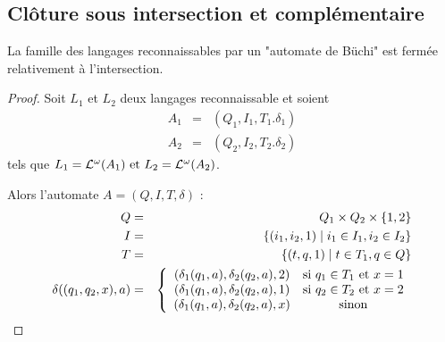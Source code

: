 \subsection{Clôture sous intersection et complémentaire}

\begin{prop}
	La famille des langages reconnaissables par un "automate de Büchi" est fermée relativement à l'intersection.
\end{prop}

\begin{proof}
	Soit $L_1$ et $L_2$ deux langages reconnaissable et soient
	\begin{eqnarray*}
		A_1 &=& (Q_1,I_1,T_1.\delta_1) \\
		A_2 &=& (Q_2,I_2,T_2.\delta_2)
	\end{eqnarray*}
	tels que $L_1 = \mathcal{L} ^ {\omega} (A_1) \text{ et }  L_2 = \mathcal{L} ^ {\omega} (A_2)$.

	Alors l'automate $A = (Q,I,T,\delta)$ :
	\begin{eqnarray*}
		Q &=& Q_1 \times Q_2 \times \left\{1,2\right\}  \\
		I &=& \left\{(i_1,i_2,1) \mid i_1 \in I_1,i_2 \in I_2 \right\} \\
		T &=&  \left\{(t,q,1) \mid t \in T_1, q \in Q\right\} \\
		\delta ((q_1,q_2,x), a) &=&
		\left\{
		\begin{array}{cc}
			(\delta_1(q_1,a), \delta_2 (q_2,a), 2) & \text {si } q_1 \in T_1 \text{ et } x = 1 \\
			(\delta_1(q_1,a), \delta_2 (q_2,a), 1) & \text {si } q_2 \in T_2 \text{ et } x = 2 \\
			(\delta_1(q_1,a), \delta_2 (q_2,a), x) & \text {sinon}
		\end{array}
		\right.
	\end{eqnarray*}
\end{proof}

